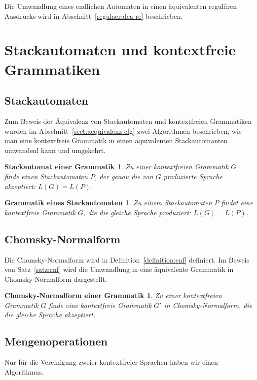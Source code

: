 Die Umwandlung eines endlichen Automaten in einen äquivalenten
regulären Ausdrucks 
wird in Abschnitt~\ref{regulaer:dea-re} beschrieben.

\section{Stackautomaten und kontextfreie Grammatiken}

\subsection{Stackautomaten}
Zum Beweis der Äquivalenz von Stackautomaten und kontextfreien Grammatiken
wurden im Abschnitt~\ref{sect:aequivalenz-cfg} zwei Algorithmen beschrieben,
wie man eine kontextfreie Grammatik in einen äquivalenten Stackautomanten
umwandenl kann und umgekehrt.

\newtheorem*{CfgPDA}{Stackautomat einer Grammatik}
\begin{CfgPDA}
Zu einer kontextfreien Grammatik $G$ finde einen Stackautomaten $P$, 
der genau die von $G$ produzierte Sprache akzeptiert: $L(G)=L(P)$.
\end{CfgPDA}

\newtheorem*{PdaCfg}{Grammatik eines Stackautomaten}
\begin{PdaCfg}
Zu einem Stackautomaten $P$ findet eine kontextfreie Grammatik $G$, die
die gleiche Sprache produziert: $L(G)=L(P)$.
\end{PdaCfg}

\subsection{Chomsky-Normalform}
Die Chomsky-Normalform wird in Definition~\ref{definition:cnf} definiert.
Im Beweis von Satz~\ref{satz:cnf} wird die Umwandlung in eine äquivalente
Grammatik in Chomsky-Normalform dargestellt.

\newtheorem*{CNF}{Chomsky-Normalform einer Grammatik}
\begin{CNF}
Zu einer kontextfreien Grammatik $G$ finde eine kontextfreie Grammatik $G'$
in Chomsky-Normalform, die die gleiche Sprache akzeptiert.
\end{CNF}

\subsection{Mengenoperationen}
Nur für die Vereinigung zweier kontextfreier Sprachen haben wir einen
Algorithmus.

